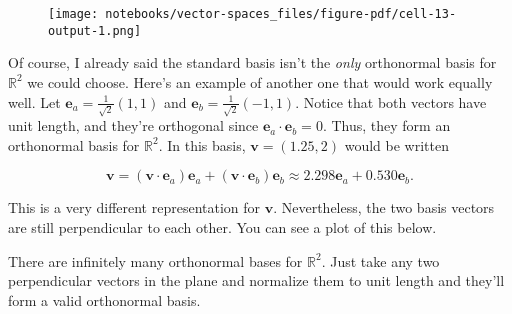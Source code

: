 \documentclass[
  letterpaper,
  DIV=11,
  numbers=noendperiod]{scrreprt}
\begin{document}
\begin{figure}[H]

{\centering \texttt{[image: notebooks/vector-spaces\_files/figure-pdf/cell-13-output-1.png]}

}

\end{figure}

Of course, I already said the standard basis isn't the \emph{only}
orthonormal basis for \(\mathbb{R}^2\) we could choose. Here's an
example of another one that would work equally well. Let
\(\mathbf{e}_a=\frac{1}{\sqrt{2}} (1,1)\) and
\(\mathbf{e}_b=\frac{1}{\sqrt{2}} (-1,1)\). Notice that both vectors
have unit length, and they're orthogonal since
\(\mathbf{e}_a \cdot \mathbf{e}_b = 0\). Thus, they form an orthonormal
basis for \(\mathbb{R}^2\). In this basis, \(\mathbf{v}=(1.25, 2)\)
would be written

\[\mathbf{v} = (\mathbf{v} \cdot \mathbf{e}_a) \mathbf{e}_a + (\mathbf{v} \cdot \mathbf{e}_b) \mathbf{e}_b \approx 2.298 \mathbf{e}_a + 0.530 \mathbf{e}_b.\]

This is a very different representation for \(\mathbf{v}\).
Nevertheless, the two basis vectors are still perpendicular to each
other. You can see a plot of this below.

There are infinitely many orthonormal bases for \(\mathbb{R}^2\). Just
take any two perpendicular vectors in the plane and normalize them to
unit length and they'll form a valid orthonormal basis.
\end{document}
